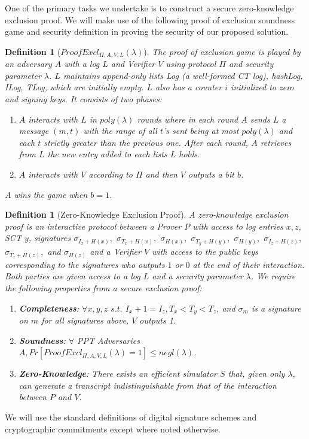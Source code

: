 \documentclass[letterpaper,twocolumn,10pt]{article}
\newtheorem{definition}[theorem]{Definition}
\begin{document}
One of the primary tasks we undertake is to construct a secure zero-knowledge exclusion proof. We will make use of the following proof of exclusion soundness game and security definition in proving the security of our proposed solution. 

\begin{definition}[$ProofExcl_{\Pi,A,V,L}(\lambda)$]
The proof of exclusion game is played by an adversary $A$ with a log $L$ and Verifier $V$ using protocol $\Pi$ and security parameter $\lambda$. $L$ maintains append-only lists \emph{Log} (a well-formed CT log), \emph{hashLog}, \emph{ILog}, \emph{TLog}, which are initially empty. $L$ also has a counter $i$ initialized to zero and signing keys. It consists of two phases:
\begin{enumerate}
\item $A$ interacts with $L$ in $poly(\lambda)$ rounds where in each round $A$ sends $L$ a message $(m, t)$ with the range of all $t$'s sent being at most $poly(\lambda)$ and each $t$ strictly greater than the previous one. After each round, $A$ retrieves from $L$ the new entry added to each lists $L$ holds.
\item $A$ interacts with $V$ according to $\Pi$ and then $V$ outputs a bit $b$.
\end{enumerate}
$A$ wins the game when $b=1$.
\end{definition}
\begin{definition}[Zero-Knowledge Exclusion Proof]
A zero-knowledge exclusion proof is an interactive protocol between a Prover $P$ with access to log entries $x,z$, SCT $y$, signatures $\sigma_{I_x+H(x)},$ $\sigma_{T_x+H(x)},$ $\sigma_{H(x)},$ $\sigma_{T_y+H(y)},$ $\sigma_{H(y)},$ $\sigma_{I_z+H(z)},$ $\sigma_{T_z+H(z)},$ and $\sigma_{H(z)}$ and a Verifier $V$ with access to the public keys corresponding to the signatures who outputs $1$ or $0$ at the end of their interaction. Both parties are given access to a log $L$ and a security parameter $\lambda$. We require the following properties from a secure exclusion proof:
\begin{enumerate}
\item \textbf{Completeness}: $\forall x,y,z$ $s.t.$ $I_x+1=I_z, T_x<T_y<T_z$, and $\sigma_m$ is a signature on $m$ for all signatures above, $V$ outputs 1.

\item \textbf{Soundness}: $\forall$ PPT Adversaries $A, Pr[ProofExcl_{\Pi,A,V,L}(\lambda)=1]\leq negl(\lambda)$.

\item \textbf{Zero-Knowledge}: There exists an efficient simulator $S$ that, given only $\lambda$, can generate a transcript indistinguishable from that of the interaction between $P$ and $V$.
\end{enumerate}
\end{definition}
We will use the standard definitions of digital signature schemes and cryptographic commitments except where noted otherwise.
\end{document}
